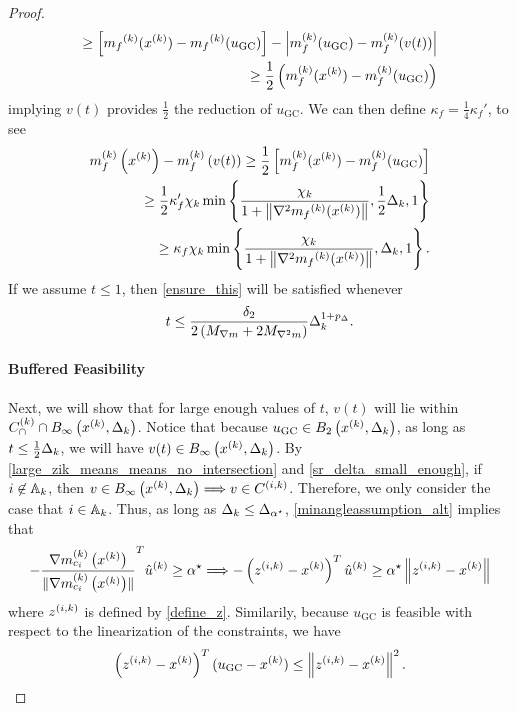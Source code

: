 \begin{proof}
\begin{align*}
 \ge \left[{{m}_f}^{(k)}(x^{(k)}) - {{m}_f}^{(k)}(u_{\textrm{GC}})\right] - \left|m_f^{(k)}(u_{\textrm{GC}}) - m_f^{(k)}(v(t)) \right| \nonumber \\
\ge \frac 1 2 \left(m_f^{(k)}(x^{(k)}) - m_f^{(k)}(u_{\textrm{GC}})\right)
\end{align*}
implying $v(t)$ provides $\frac 1 2$ the reduction of $u_{\textrm{GC}}$.
We can then define $\kappa_f = \frac 1 4 \kappa_f'$, to see
\begin{align*}
m_f^{(k)}\left(x^{(k)}\right) - m_f^{(k)}\left(v(t)\right)
\ge \frac 1 2 \left[m_f^{(k)}(x^{(k)}) - m_f^{(k)}(u_{\textrm{GC}})\right] \\
\ge \frac 1 2 \kappa_f' \chi_k \min\left\{ \frac{\chi_k}{1+\left\|\nabla^2 {{m}_f}^{(k)}(x^{(k)})\right\|}, \frac 1 2 \Delta_k, 1 \right\} \\
\ge \kappa_f \chi_k \min\left\{ \frac{\chi_k}{1+\left\|\nabla^2 {{m}_f}^{(k)}(x^{(k)})\right\|}, \Delta_k, 1 \right\}.
\end{align*}
If we assume $t \le 1$, then \cref{ensure_this} will be satisfied whenever
\begin{align*}
t \le \frac {\delta_2}{2\left({M_{\nabla m}} + 2{M_{\nabla^2 m}}\right)} \Delta_k^{1 + p_{\Delta}}.
\end{align*}




\paragraph{Buffered Feasibility}
Next, we will show that for large enough values of $t$, $v(t)$ will lie within ${C^{(k)}_{\cap}} \cap { B_{\infty}\left(x^{(k)}, \Delta_k\right) }$.
Notice that because $u_{\textrm{GC}} \in B_2\left(x^{(k)}, \Delta_k\right)$, as long as $t \le \frac 1 2 \Delta_k$, we will have $v(t) \in { B_{\infty}\left(x^{(k)}, \Delta_k\right) }$.
By \cref{large_zik_means_means_no_intersection} and \cref{sr_delta_small_enough}, if $i \not \in {\mathbb A_{k}}$, then $v \in { B_{\infty}\left(x^{(k)}, \Delta_k\right) } \Longrightarrow v \in {C^{(i, k)}}$.
Therefore, we only consider the case that $i \in {\mathbb A_{k}}$.
Thus, as long as $\Delta_k \le {\Delta_{\alpha^{\star}}}$, \cref{minangleassumption_alt} implies that
\begin{align}
-\frac {{\nabla m_{c_i}^{(k)}\left(x^{(k)}\right)}}{\|{\nabla m_{c_i}^{(k)}\left(x^{(k)}\right)}\|} ^T{{\hat u}^{(k)}} \ge { \alpha^{\star} } \Longrightarrow -\left({z^{(i, k)}} - x^{(k)}\right)^T{{\hat u}^{(k)}} \ge { \alpha^{\star} } \left\|{z^{(i, k)}} - x^{(k)}\right\| \label{u_is_feasible}
\end{align}
where ${z^{(i, k)}}$ is defined by \cref{define_z}.
Similarily, because $u_{\textrm{GC}}$ is feasible with respect to the linearization of the constraints, we have
\begin{align}
\left({z^{(i, k)}} - x^{(k)}\right)^T(u_{\textrm{GC}} - x^{(k)}) \le \left\|{z^{(i, k)}} - x^{(k)}\right\|^2. \label{gc_is_feasible}
\end{align}


\end{proof}
